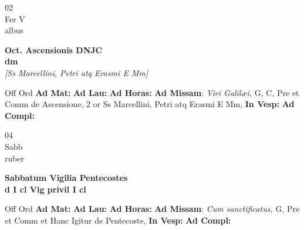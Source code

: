 \documentclass[10pt, openany]{book}
\begin{document}
        \begin{center}
            \begin{minipage}{3.5in}
                \vspace{2em}
                \begin{minipage}{0.5in}
                    {\Huge 02} \\
                    {\normalsize Fer V} \\
                    {\normalsize albus}
                \end{minipage}
                \begin{minipage}{3.0in}
                    \textbf{ \large Oct. Ascensionis DNJC \\
                    \textnormal{\normalsize dm}} \\ \textit{[Ss Marcellini, Petri atq Erasmi E Mm]} \\ 
                \end{minipage}
                \begin{justify}Off Ord
                    \textbf{Ad Mat: }
                    \textbf{Ad Lau: }
                    \textbf{Ad Horas: }\textbf{Ad Missam}: \textit{Viri Galilæi,} G, C, Pre et Comm de Ascensione, 2 or Ss Marcellini, Petri atq Erasmi E Mm,  
                    \textbf{In Vesp: }
                    \textbf{Ad Compl: }
                \end{justify}
            \end{minipage}
        \end{center}
    
        \begin{center}
            \begin{minipage}{3.5in}
                \vspace{2em}
                \begin{minipage}{0.5in}
                    {\Huge 04} \\
                    {\normalsize Sabb} \\
                    {\normalsize ruber}
                \end{minipage}
                \begin{minipage}{3.0in}
                    \textbf{ \large Sabbatum Vigilia Pentecostes \\
                    \textnormal{\normalsize d I cl Vig privil I cl}} \\ 
                \end{minipage}
                \begin{justify}Off Ord
                    \textbf{Ad Mat: }
                    \textbf{Ad Lau: }
                    \textbf{Ad Horas: }\textbf{Ad Missam}: \textit{Cum sanctificatus,} G, Pre et Comm et Hanc Igitur de Pentecoste,  
                    \textbf{In Vesp: }
                    \textbf{Ad Compl: }
                \end{justify}
            \end{minipage}
        \end{center}
    
\end{document}
